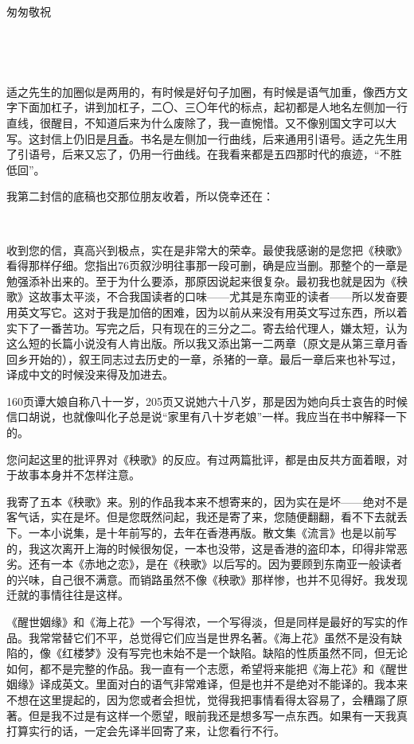 \par 匆匆敬祝
\par {}
\par  
\par {}
\par {}
\par {}
\par  
\par 适之先生的加圈似是两用的，有时候是好句子加圈，有时候是语气加重，像西方文字下面加杠子，讲到加杠子，二〇、三〇年代的标点，起初都是人地名左侧加一行直线，很醒目，不知道后来为什么废除了，我一直惋惜。又不像别国文字可以大写。这封信上仍旧是\uline{月香}。书名是左侧加一行曲线，后来通用引语号。适之先生用了引语号，后来又忘了，仍用一行曲线。在我看来都是五四那时代的痕迹，“不胜低回”。
\par 我第二封信的底稿也交那位朋友收着，所以侥幸还在：
\par  
\par {}
\par 收到您的信，真高兴到极点，实在是非常大的荣幸。最使我感谢的是您把《秧歌》看得那样仔细。您指出76页叙沙明往事那一段可删，确是应当删。那整个的一章是勉强添补出来的。至于为什么要添，那原因说起来很复杂。最初我也就是因为《秧歌》这故事太平淡，不合我国读者的口味——尤其是东南亚的读者——所以发奋要用英文写它。这对于我是加倍的困难，因为以前从来没有用英文写过东西，所以着实下了一番苦功。写完之后，只有现在的三分之二。寄去给代理人，嫌太短，认为这么短的长篇小说没有人肯出版。所以我又添出第一二两章（原文是从第三章月香回乡开始的），叙王同志过去历史的一章，杀猪的一章。最后一章后来也补写过，译成中文的时候没来得及加进去。
\par 160页谭大娘自称八十一岁，205页又说她六十八岁，那是因为她向兵士哀告的时候信口胡说，也就像叫化子总是说“家里有八十岁老娘”一样。我应当在书中解释一下的。
\par 您问起这里的批评界对《秧歌》的反应。有过两篇批评，都是由反共方面着眼，对于故事本身并不怎样注意。
\par 我寄了五本《秧歌》来。别的作品我本来不想寄来的，因为实在是坏——绝对不是客气话，实在是坏。但是您既然问起，我还是寄了来，您随便翻翻，看不下去就丢下。一本小说集，是十年前写的，去年在香港再版。散文集《流言》也是以前写的，我这次离开上海的时候很匆促，一本也没带，这是香港的盗印本，印得非常恶劣。还有一本《赤地之恋》，是在《秧歌》以后写的。因为要顾到东南亚一般读者的兴味，自己很不满意。而销路虽然不像《秧歌》那样惨，也并不见得好。我发现迁就的事情往往是这样。
\par 《醒世姻缘》和《海上花》一个写得浓，一个写得淡，但是同样是最好的写实的作品。我常常替它们不平，总觉得它们应当是世界名著。《海上花》虽然不是没有缺陷的，像《红楼梦》没有写完也未始不是一个缺陷。缺陷的性质虽然不同，但无论如何，都不是完整的作品。我一直有一个志愿，希望将来能把《海上花》和《醒世姻缘》译成英文。里面对白的语气非常难译，但是也并不是绝对不能译的。我本来不想在这里提起的，因为您或者会担忧，觉得我把事情看得太容易了，会糟蹋了原著。但是我不过是有这样一个愿望，眼前我还是想多写一点东西。如果有一天我真打算实行的话，一定会先译半回寄了来，让您看行不行。
